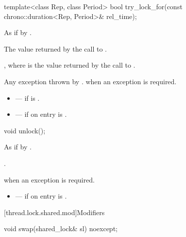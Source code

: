 %
\begin{itemdecl}
template<class Rep, class Period>
  bool try_lock_for(const chrono::duration<Rep, Period>& rel_time);
\end{itemdecl}

\begin{itemdescr}
\pnum
\effects
As if by .

\pnum
\returns
The value returned by the call to .

\pnum
\ensures
{}, where  is the value returned by the call to .

\pnum
\throws
Any exception thrown by .  when an exception is required.

\pnum
\errors
\begin{itemize}
\item {} --- if  is .
\item {} --- if on entry  is
.
\end{itemize}
\end{itemdescr}

%
\begin{itemdecl}
void unlock();
\end{itemdecl}

\begin{itemdescr}
\pnum
\effects
As if by .

\pnum
\ensures
{}.

\pnum
\throws
{} when an exception is required.

\pnum
\errors
\begin{itemize}
\item {} --- if on entry  is
.
\end{itemize}
\end{itemdescr}

[thread.lock.shared.mod]{Modifiers}

%
\begin{itemdecl}
void swap(shared_lock& sl) noexcept;
\end{itemdecl}

